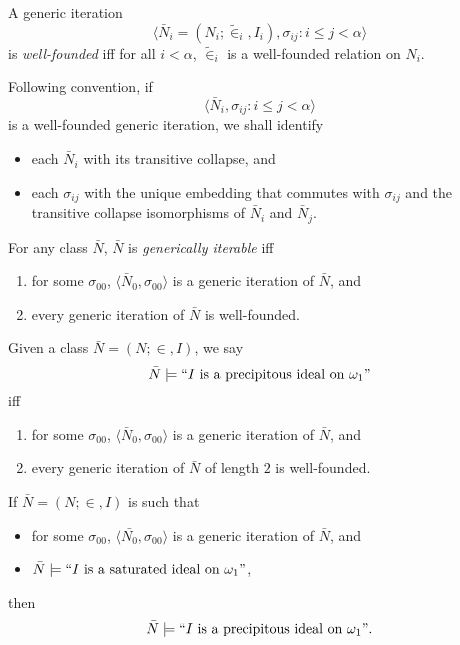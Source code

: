 \documentclass[12pt]{article}
\numberwithin{equation}{section}
\begin{document}
\begin{defi}
A generic iteration $$\langle \bar{N}_i = (N_i; \tilde{\in}_i, I_i), \sigma_{ij} : i \leq j < \alpha \rangle$$ is \emph{well-founded} iff for all $i < \alpha$, $\tilde{\in}_i$ is a well-founded relation on $N_i$.
\end{defi}

Following convention, if $$\langle \bar{N}_i, \sigma_{ij} : i \leq j < \alpha \rangle$$ is a well-founded generic iteration, we shall identify 
\begin{itemize}
    \item each $\bar{N}_i$ with its transitive collapse, and
    \item each $\sigma_{ij}$ with the unique embedding that commutes with $\sigma_{ij}$ and the transitive collapse isomorphisms of $\bar{N}_i$ and $\bar{N}_j$.
\end{itemize}

\begin{defi}
For any class $\bar{N}$, $\bar{N}$ is \emph{generically iterable} iff  
\begin{enumerate}[label=(\alph*)]
    \item for some $\sigma_{00}$, $\langle \bar{N}_0, \sigma_{00} \rangle$ is a generic iteration of $\bar{N}$, and
    \item every generic iteration of $\bar{N}$ is well-founded.
\end{enumerate}
\end{defi}

\begin{defi}
Given a class $\bar{N} = (N; \in, I)$, we say 
\begin{equation*}
    \bar{N} \models ``I \text{ is a precipitous ideal on } \omega_1"
\end{equation*}
iff
\begin{enumerate}[label=(\alph*)]
    \item for some $\sigma_{00}$, $\langle \bar{N}_0, \sigma_{00} \rangle$ is a generic iteration of $\bar{N}$, and
    \item every generic iteration of $\bar{N}$ of length $2$ is well-founded.
\end{enumerate}
\end{defi}

\begin{fact}\label{satipre}
If $\bar{N} = (N; \in, I)$ is such that 
\begin{itemize}
    \item for some $\sigma_{00}$, $\langle \bar{N_0}, \sigma_{00} \rangle$ is a generic iteration of $\bar{N}$, and
    \item $\bar{N} \models ``I \text{ is a saturated ideal on } \omega_1"$,
\end{itemize}
then
\begin{equation*}
    \bar{N} \models ``I \text{ is a precipitous ideal on } \omega_1".
\end{equation*}
\end{fact}
\end{document}
